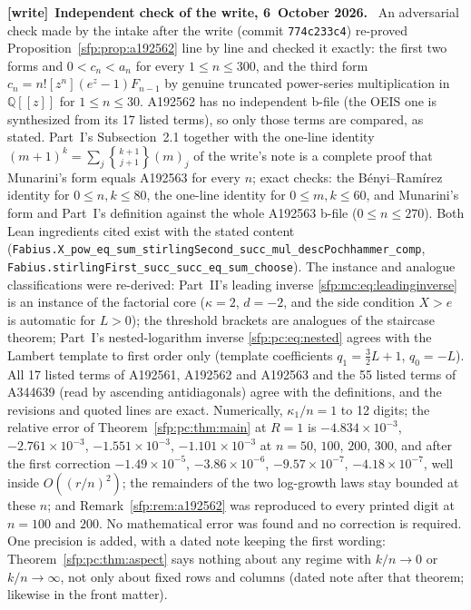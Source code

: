 \documentclass[11pt,letterpaper]{article}
\numberwithin{equation}{section}
\theoremstyle{definition}\newtheorem{definition}[theorem]{Definition}
\theoremstyle{remark}\newtheorem{remark}[theorem]{Remark}
\newcommand{\stwo}[2]{\genfrac{\{} {\}}{0pt}{}{#1}{#2}}
\newcommand{\file}[1]{\nolinkurl{#1}}
\newenvironment{writenote}[1][]{\par\smallskip\begingroup\small
 \noindent\textbf{[write]}\if\relax\detokenize{#1}\relax\else~\textbf{#1.}\fi\ }%
 {\par\endgroup\smallskip}
\begin{document}
\begin{writenote}[Independent check of the write, 6~October 2026]
An adversarial check made by the intake after the write (commit \file{774c233c4}) re-proved Proposition~\ref{sfp:prop:a192562} line by line and checked it exactly: the first two forms and $0<c_n<a_n$ for every $1\le n\le300$, and the third form $c_n=n![z^n](e^z-1)F_{n-1}$ by genuine truncated power-series multiplication in $\mathbb Q[[z]]$ for $1\le n\le30$. A192562 has no independent b-file (the OEIS one is synthesized from its 17 listed terms), so only those terms are compared, as stated. Part~I's Subsection~2.1 together with the one-line identity $(m+1)^k=\sum_j\stwo{k+1}{j+1}(m)_j$ of the write's note is a complete proof that Munarini's form equals A192563 for every $n$; exact checks: the B\'enyi--Ram\'irez identity for $0\le n,k\le80$, the one-line identity for $0\le m,k\le60$, and Munarini's form and Part~I's definition against the whole A192563 b-file ($0\le n\le270$). Both Lean ingredients cited exist with the stated content (\file{Fabius.X_pow_eq_sum_stirlingSecond_succ_mul_descPochhammer_comp}, \file{Fabius.stirlingFirst_succ_succ_eq_sum_choose}). The instance and analogue classifications were re-derived: Part~II's leading inverse \eqref{sfp:mc:eq:leadinginverse} is an instance of the factorial core ($\kappa=2$, $d=-2$, and the side condition $X>e$ is automatic for $L>0$); the threshold brackets are analogues of the staircase theorem; Part~I's nested-logarithm inverse \eqref{sfp:pc:eq:nested} agrees with the Lambert template to first order only (template coefficients $q_1=\frac32L+1$, $q_0=-L$). All 17 listed terms of A192561, A192562 and A192563 and the 55 listed terms of A344639 (read by ascending antidiagonals) agree with the definitions, and the revisions and quoted lines are exact. Numerically, $\kappa_1/n=1$ to 12 digits; the relative error of Theorem~\ref{sfp:pc:thm:main} at $R=1$ is $-4.834\times10^{-3}$, $-2.761\times10^{-3}$, $-1.551\times10^{-3}$, $-1.101\times10^{-3}$ at $n=50$, $100$, $200$, $300$, and after the first correction $-1.49\times10^{-5}$, $-3.86\times10^{-6}$, $-9.57\times10^{-7}$, $-4.18\times10^{-7}$, well inside $O((r/n)^2)$; the remainders of the two log-growth laws stay bounded at these $n$; and Remark~\ref{sfp:rem:a192562} was reproduced to every printed digit at $n=100$ and $200$. No mathematical error was found and no correction is required. One precision is added, with a dated note keeping the first wording: Theorem~\ref{sfp:pc:thm:aspect} says nothing about any regime with $k/n\to0$ or $k/n\to\infty$, not only about fixed rows and columns (dated note after that theorem; likewise in the front matter).
\end{writenote}
\end{document}
